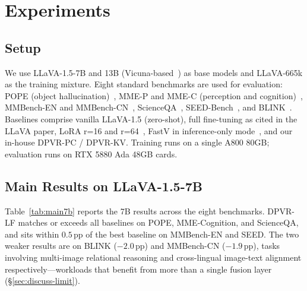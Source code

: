 \documentclass[a4paper,fleqn,review]{cas-sc}
\newcommand{\dpvrlf}{DPVR-LF}
\newcommand{\dpvrpc}{DPVR-PC}
\newcommand{\dpvrkv}{DPVR-KV}
\begin{document}
\section{Experiments}\label{sec:exp}

\subsection{Setup}

We use LLaVA-1.5-7B and 13B (Vicuna-based~\citep{vicuna2023,
touvron2023llama}) as base models and LLaVA-665k as the
training mixture. Eight standard benchmarks are used for evaluation:
POPE (object hallucination)~\citep{li2023pope}, MME-P and MME-C
(perception and cognition)~\citep{fu2023mme}, MMBench-EN and
MMBench-CN~\citep{liu2023mmbench},
ScienceQA~\citep{lu2022scienceqa},
SEED-Bench~\citep{li2024seedbench}, and BLINK~\citep{fu2024blink}.
Baselines comprise vanilla LLaVA-1.5 (zero-shot), full fine-tuning
as cited in the LLaVA paper, LoRA r=16 and r=64~\citep{hu2022lora},
FastV in inference-only mode~\citep{cai2024fastv}, and our in-house
\dpvrpc{} / \dpvrkv{}. Training runs on a single A800 80GB; evaluation
runs on RTX 5880 Ada 48GB cards.

\subsection{Main Results on LLaVA-1.5-7B}\label{sec:exp-main7b}

Table~\ref{tab:main7b} reports the 7B results across the eight
benchmarks. \dpvrlf{} matches or exceeds all baselines on POPE,
MME-Cognition, and ScienceQA, and sits within $0.5$\,pp of the best
baseline on MMBench-EN and SEED. The two weaker results are on BLINK
($-2.0$\,pp) and MMBench-CN ($-1.9$\,pp), tasks involving
multi-image relational reasoning and cross-lingual image-text
alignment respectively---workloads that benefit from more than a
single fusion layer (\S\ref{sec:discuss-limit}).
\end{document}
